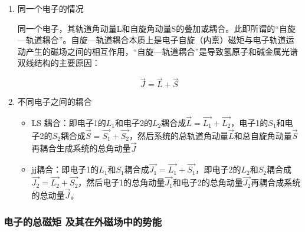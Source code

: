 \documentclass[dvipsnames, svgnames,a4paper,11pt]{article}
\begin{document}
	\begin{enumerate}
		\item 同一个电子的情况

			同一个电子，其轨道角动量L和自旋角动量S的叠加或耦合。此即所谓的“自旋—轨道耦合”。自旋—轨道耦合本质上是电子自旋（内禀）磁矩与电子轨道运动产生的磁场之间的相互作用，“自旋—轨道耦合”是导致氢原子和碱金属光谱双线结构的主要原因：

				\[
					\vec{J}=\vec{L}+\vec{S}	
				\]

		\item 不同电子之间的耦合

			\begin{itemize}
				\item LS 耦合：即电子1的$L_1$和电子2的$L_2$耦合成$\vec{L}=\vec{L_1}+\vec{L_2}$，电子1的$S_1$和电子2的$S_2$耦合成$\vec{S}=\vec{S_1}+\vec{S_2}$，然后系统的总轨道角动量$\vec{L}$和总自旋角动量$\vec{S}$再耦合生成系统的总角动量$\vec{J}$
				
				\item jj耦合：即电子1的$L_1$和$S_1$耦合成$\vec{J_1}=\vec{L_1}+\vec{S_1}$，即电子2的$L_2$和$S_2$耦合成$\vec{J_2}=\vec{L_2}+\vec{S_2}$，然后电子1的总角动量$\vec{J_1}$和电子2的总角动量$\vec{J_2}$再耦合成系统的总动量$\vec{J}$。
			\end{itemize}

			
	\end{enumerate}



\subsubsection{电子的总磁矩 及其在外磁场中的势能}
\end{document}
